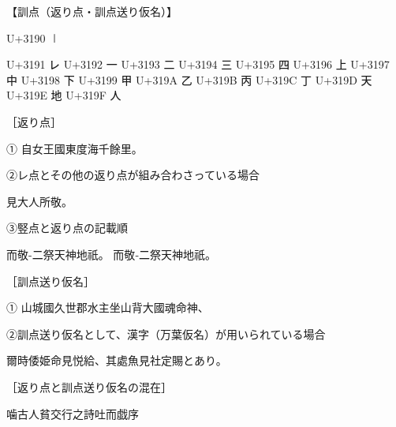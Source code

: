 \documentclass[paper=a5,tate]{jlreq}\listfiles
\begin{document}
【訓点（返り点・訓点送り仮名）】

U+3190	㆐	%

U+3191	㆑	%
U+3192	㆒	%
U+3193	㆓	%
U+3194	㆔	%
U+3195	㆕	%
U+3196	㆖	%
U+3197	㆗	%
U+3198	㆘	%
U+3199	㆙	%
U+319A	㆚	%
U+319B	㆛	%
U+319C	㆜	%
U+319D	㆝	%
U+319E	㆞	%
U+319F	㆟	%

［返り点］

①
自女王國東度海千餘里。

②レ点とその他の返り点が組み合わさっている場合

見大人所敬。

③竪点と返り点の記載順

而敬\kaeriten-{㆓}祭天神地祇。
而敬\kaeriten‐{㆓}祭天神地祇。

［訓点送り仮名］

①
山城國久世郡水主坐山背大國魂命神、

②訓点送り仮名として、漢字（万葉仮名）が用いられている場合

爾時倭姫命見悦給、其處魚見社定賜とあり。

［返り点と訓点送り仮名の混在］

噛古人貧交行之詩吐而戯序
\end{document}

